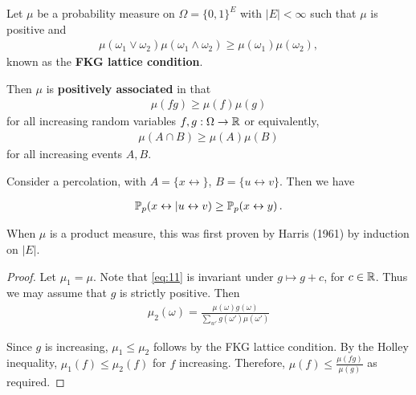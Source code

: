 \begin{thm}
  \label{defn:random_walks_on_graphs:13}
  Let $\mu$ be a probability measure on $\Omega = \{ 0, 1 \}^{E}$ with
  $|E| < \infty$ such that $\mu$  is positive and
  \begin{align}
    \label{eq:10}
    \mu(\omega_{1} \vee \omega_{2}) \mu(\omega_{1} \wedge \omega_{2})
    \geq \mu(\omega_{1}) \mu(\omega_{2}),
  \end{align} known as the \textbf{FKG lattice condition}.

  Then $\mu$ is \textbf{positively associated} in that
  \begin{align}
    \label{eq:11}
    \mu(fg) \geq \mu(f) \mu(g)
  \end{align} for all increasing random variables $f, g: \Omega
  \rightarrow \mathbb{R}$ or equivalently,
  \begin{align}
    \label{eq:12}
    \mu(A \cap B) \geq \mu(A) \mu(B)
  \end{align} for all increasing events $A, B$.
\end{thm}

\begin{exmp}
  \label{defn:random_walks_on_graphs:14}
  Consider a percolation, with $A = \{ x \leftrightarrow \}$, $B = \{
  u \leftrightarrow v \}$. Then we have

  \begin{align}
    \label{eq:13}
    \Prob{x \leftrightarrow | u \leftrightarrow v}{p} \geq \Prob{x
      \leftrightarrow y}{p}.
  \end{align}
\end{exmp}

\begin{history}
  When $\mu$ is a product measure, this was first proven by Harris
  (1961) by induction on $|E|$.  
\end{history}

\begin{proof}
  Let $\mu_{1} = \mu$. Note that \eqref{eq:11} is invariant under $g
  \mapsto g + c$, for $c \in \mathbb{R}$.  Thus we may assume that $g$ is
  strictly positive.  Then
  \begin{align}
    \label{eq:14}
    \mu_{2}(\omega) = \frac{\mu(\omega) g(\omega)}{\sum_{w'}
      g(\omega') \mu(\omega')}  
  \end{align}

  Since $g$ is increasing, $\mu_{1} \leq \mu_{2}$ follows by the FKG
  lattice condition. By the Holley inequality, $\mu_{1}(f) \leq
  \mu_{2}(f)$ for $f$ increasing. Therefore, $\mu(f) \leq
  \frac{\mu(fg)}{\mu(g)}$ as required.
\end{proof}

